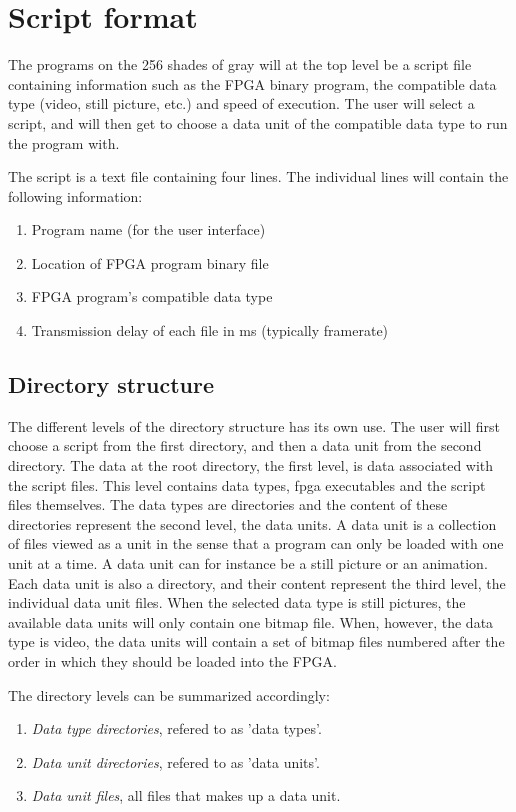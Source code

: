 \section{Script format}

The programs on the 256 shades of gray will at the top level be a script file containing information such as the FPGA binary program, the compatible data type (video, still picture, etc.) and speed of execution. The user will select a script, and will then get to choose a data unit of the compatible data type to run the program with.

The script is a text file containing four lines. The individual lines will contain the following information:

\begin{enumerate}
\item Program name (for the user interface)
\item Location of FPGA program binary file
\item FPGA program's compatible data type
\item Transmission delay of each file in ms (typically framerate)
\end{enumerate}

\subsection{Directory structure}

The different levels of the directory structure has its own use. The user will first choose a script from the first directory, and then a data unit from the second directory. The data at the root directory, the first level, is data associated with the script files. This level contains data types, fpga executables and the script files themselves. The data types are directories and the content of these directories represent the second level, the data units. A data unit is a collection of files viewed as a unit in the sense that a program can only be loaded with one unit at a time. A data unit can for instance be a still picture or an animation. Each data unit is also a directory, and their content represent the third level, the individual data unit files. When the selected data type is still pictures, the available data units will only contain one bitmap file. When, however, the data type is video, the data units will contain a set of bitmap files numbered after the order in which they should be loaded into the FPGA. %

The directory levels can be summarized accordingly:
\begin{enumerate}
\item \emph{Data type directories}, refered to as 'data types'.
\item \emph{Data unit directories}, refered to as 'data units'.
\item \emph{Data unit files}, all files that makes up a data unit.
\end{enumerate}
 
